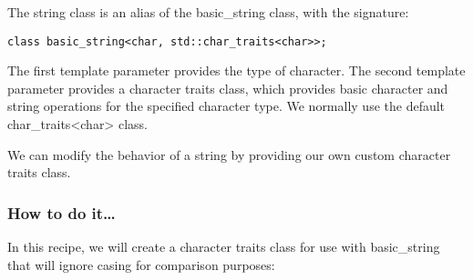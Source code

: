 
The string class is an alias of the basic\_string class, with the signature:

\begin{lstlisting}[style=styleCXX]
class basic_string<char, std::char_traits<char>>;
\end{lstlisting}

The first template parameter provides the type of character. The second template parameter provides a character traits class, which provides basic character and string operations for the specified character type. We normally use the default char\_traits<char> class.

We can modify the behavior of a string by providing our own custom character traits class.

\subsubsection{How to do it…}

In this recipe, we will create a character traits class for use with basic\_string that will ignore casing for comparison purposes:

